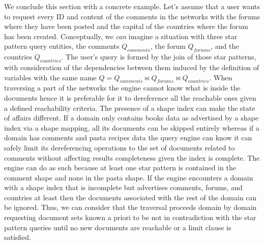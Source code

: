 We conclude this section with a concrete example.
Let's assume that a user wants to request every ID and content of the comments in the networks with the forums where they have been posted and the capital of the countries where the forum has been created.
Conceptually, we \emph{can} imagine a situation with three star pattern query entities, the comments $ Q_{comments}$, the forum $Q_{forums}$, and the countries $Q_{countries}$.
The user's query is formed by the join of those star patterns, with consideration of the dependencies between them induced by the definition of variables with the same name $Q = Q_{comments} \bowtie Q_{forums} \bowtie Q_{countries}$. 
When traversing a part of the networks the engine cannot know what is inside the documents hence it is preferable for it to dereference all the reachable ones given a defined reachability criteria.
The presence of a shape index can make the state of affairs different.
If a domain only contains books data as advertised by a shape index via a shape mapping, all its documents can be skipped entirely 
whereas if a domain has comments and pasta recipes data the query engine can know it can safely limit its dereferencing operations to the set of documents related to comments without affecting results completeness given the index is complete.
The engine can do as such because at least one star pattern is contained in the comment shape and none in the pasta shape.
If the engine encounters a domain with a shape index that is incomplete but advertises comments, forums, and countries at least then the documents associated with the rest of the domain can be ignored.
Thus, we can consider that the traversal proceeds domain by domain requesting document sets known a priori to be not in contradiction with the star pattern queries until no new documents are reachable or a limit clause is satisfied.
